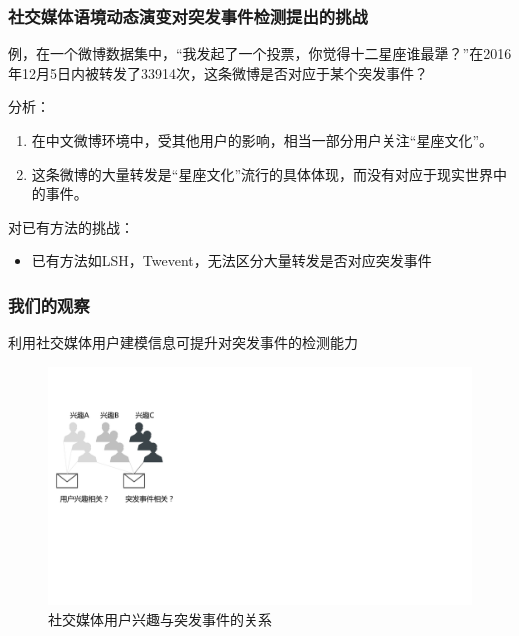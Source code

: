 \begin{frame}
\frametitle{\noindent 社交媒体语境动态演变对突发事件检测提出的挑战}
{\color{blue}例}，在一个微博数据集中，“我发起了一个投票，你觉得十二星座谁最犟？”在2016年12月5日内被转发了33914次，这条微博是否对应于某个突发事件？

分析：
\begin{enumerate}
	\item 在中文微博环境中，受其他用户的影响，相当一部分用户关注“星座文化”。
	\item 这条微博的大量转发是“星座文化”流行的具体体现，而没有对应于现实世界中的事件。
\end{enumerate}

{\color{red}对已有方法的挑战：}
\begin{itemize}
	\item 已有方法如LSH，Twevent，无法区分大量转发是否对应突发事件
\end{itemize}
\end{frame}

\begin{frame}
\frametitle{\noindent 我们的观察}
	利用社交媒体用户建模信息可提升对突发事件的检测能力
	\begin{figure}[h]
		\setlength{\abovecaptionskip}{0.cm}
        \setlength{\belowcaptionskip}{0.cm}
        \centering
		\caption{社交媒体用户兴趣与突发事件的关系}
        \includegraphics[width=0.48\columnwidth]{img/UMIETM/UMIETM_insights.pdf}
	\end{figure}
\end{frame}



